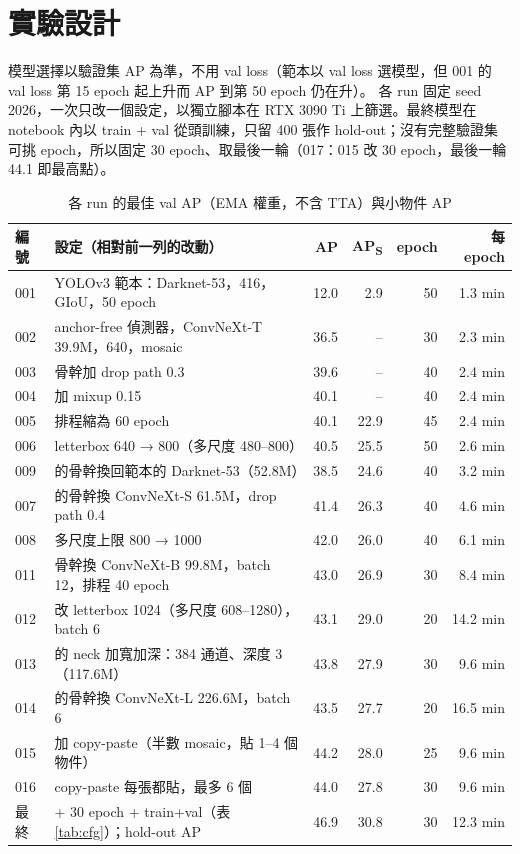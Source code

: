 \documentclass[10pt,a4paper]{article}
\renewcommand{\small}{\fontsize{9.5pt}{15pt}\selectfont}
\newcommand{\bestval}{46.9}       %
\newcommand{\baselineval}{12.0}   %
\begin{document}
\section{實驗設計}
模型選擇以驗證集 AP 為準，不用 val loss（範本以 val loss 選模型，但 001 的 val loss 第 15 epoch 起上升而 AP 到第 50 epoch 仍在升）。
各 run 固定 seed 2026，一次只改一個設定，以獨立腳本在 RTX 3090 Ti 上篩選。最終模型在 notebook 內以 train + val 從頭訓練，只留 400 張作 hold-out；沒有完整驗證集可挑 epoch，所以固定 30 epoch、取最後一輪（017：015 改 30 epoch，最後一輪 44.1 即最高點）。

\begin{table}[H]
\centering\small
\caption{各 run 的最佳 val AP（EMA 權重，不含 TTA）與小物件 AP}
\label{tab:runs}
\begin{tabularx}{\linewidth}{@{}l >{\raggedright\arraybackslash}X r r r r@{}}
\toprule
編號 & 設定（相對前一列的改動） & AP & AP\textsubscript{S} & epoch & 每 epoch \\
\midrule
001 & YOLOv3 範本：Darknet-53，416，GIoU，50 epoch & \baselineval & 2.9 & 50 & 1.3 min \\
002 & anchor-free 偵測器，ConvNeXt-T 39.9M，640，mosaic & 36.5 & – & 30 & 2.3 min \\
003 & 骨幹加 drop path 0.3 & 39.6 & – & 40 & 2.4 min \\
004 & 加 mixup 0.15 & 40.1 & – & 40 & 2.4 min \\
005 & 排程縮為 60 epoch & 40.1 & 22.9 & 45 & 2.4 min \\
006 & letterbox 640 → 800（多尺度 480–800） & 40.5 & 25.5 & 50 & 2.6 min \\
009 & 006 的骨幹換回範本的 Darknet-53（52.8M） & 38.5 & 24.6 & 40 & 3.2 min \\
007 & 006 的骨幹換 ConvNeXt-S 61.5M，drop path 0.4 & 41.4 & 26.3 & 40 & 4.6 min \\
008 & 多尺度上限 800 → 1000 & 42.0 & 26.0 & 40 & 6.1 min \\
011 & 骨幹換 ConvNeXt-B 99.8M，batch 12，排程 40 epoch & 43.0 & 26.9 & 30 & 8.4 min \\
012 & 011 改 letterbox 1024（多尺度 608–1280），batch 6 & 43.1 & 29.0 & 20 & 14.2 min \\
013 & 011 的 neck 加寬加深：384 通道、深度 3（117.6M） & 43.8 & 27.9 & 30 & 9.6 min \\
014 & 013 的骨幹換 ConvNeXt-L 226.6M，batch 6 & 43.5 & 27.7 & 20 & 16.5 min \\
015 & 013 加 copy-paste（半數 mosaic，貼 1–4 個物件） & 44.2 & 28.0 & 25 & 9.6 min \\
016 & copy-paste 每張都貼，最多 6 個 & 44.0 & 27.8 & 30 & 9.6 min \\
\midrule
最終 & 016 + 30 epoch + train+val（表 \ref{tab:cfg}）；hold-out AP & \bestval & 30.8 & 30 & 12.3 min \\
\bottomrule
\end{tabularx}
\end{table}
\end{document}
